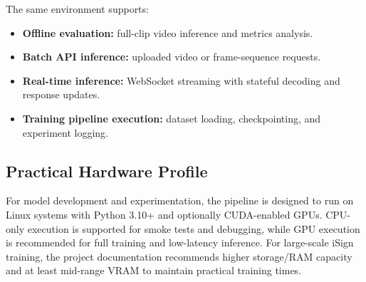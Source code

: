 The same environment supports:
\begin{itemize}[leftmargin=1.5em]
\item \textbf{Offline evaluation:} full-clip video inference and metrics analysis.
\item \textbf{Batch API inference:} uploaded video or frame-sequence requests.
\item \textbf{Real-time inference:} WebSocket streaming with stateful decoding and response updates.
\item \textbf{Training pipeline execution:} dataset loading, checkpointing, and experiment logging.
\end{itemize}

\subsection{Practical Hardware Profile}
For model development and experimentation, the pipeline is designed to run on Linux systems with Python 3.10+ and optionally CUDA-enabled GPUs. CPU-only execution is supported for smoke tests and debugging, while GPU execution is recommended for full training and low-latency inference. For large-scale iSign training, the project documentation recommends higher storage/RAM capacity and at least mid-range VRAM to maintain practical training times.
